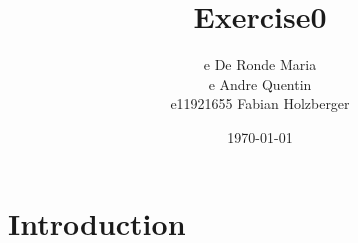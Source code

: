 \documentclass[11pt]{article}
\title{Exercise0}
\author{e De Ronde Maria \\ e Andre Quentin  \\ e11921655 Fabian Holzberger }
\date{\today}
\begin{document}
\graphicspath{{./figures/}}
\maketitle
\section{Introduction}

\newpage


\end{document}
